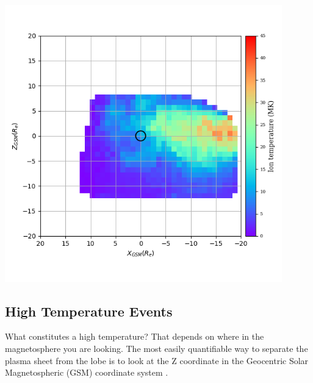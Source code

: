 \documentclass[12pt]{article}
\newenvironment{Figure}
  {\par\medskip\noindent\minipage{\linewidth}}
  {\endminipage\par\medskip}
\begin{document}
\begin{Figure}
    \begin{minipage}[c]{0.57\textwidth}
        \centering
        \includegraphics[width=0.9\textwidth]{tempLocations.png}
    \end{minipage}\hfill
    \begin{minipage}[c]{0.4\textwidth}
        \label{fig:tempLocations}
    \end{minipage}
\end{Figure}

\subsection{High Temperature Events}
What constitutes a high temperature? That depends on where in the magnetosphere you are looking. The most easily quantifiable way to separate the plasma sheet from the lobe is to look at the Z coordinate in the Geocentric Solar Magnetospheric (GSM) coordinate system \cite{maus_2006}.
\end{document}
